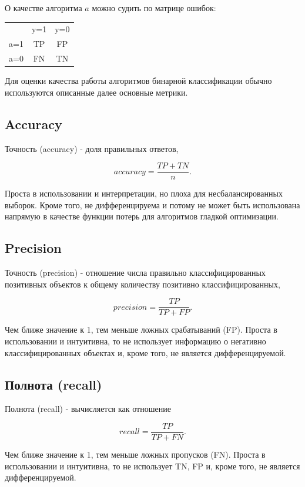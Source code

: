 О качестве алгоритма $a$ можно судить по матрице ошибок:
\begin{center}
\begin{tabular}{ c c c }
     & y=1 & y=0 \\ 
 a=1 & TP  & FP \\  
 a=0 & FN  & TN    
\end{tabular}
\end{center}

Для оценки качества работы алгоритмов бинарной классификации обычно используются описанные далее основные метрики.

\subsection{Accuracy}

Точность (accuracy) - доля правильных ответов,

$$
accuracy = \frac{TP + TN}{n}.
$$

Проста в использовании и интерпретации, но плоха для несбалансированных выборок. Кроме того, не дифференцируема и потому не может быть использована напрямую в качестве функции потерь для алгоритмов гладкой оптимизации.

\subsection{Precision}

Точность (precision) - отношение числа правильно классифицированных позитивных объектов к общему количеству позитивно классифицированных,

$$
precision = \frac{TP}{TP + FP}.
$$

Чем ближе значение к 1, тем меньше ложных срабатываний (FP). Проста в использовании и интуитивна, то не использует информацию о негативно классифицированных объектах и, кроме того, не является дифференцируемой.

\subsection{Полнота (recall)}

Полнота (recall) - вычисляется как отношение

$$
recall = \frac{TP}{TP + FN}.
$$

Чем ближе значение к 1, тем меньше ложных пропусков (FN). Проста в использовании и интуитивна, то не использует TN, FP и, кроме того, не является дифференцируемой.

